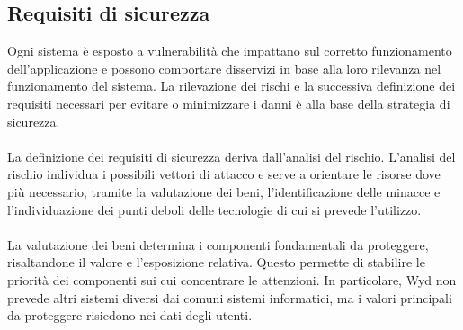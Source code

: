 \clearpage

\subsection{Requisiti di sicurezza}

Ogni sistema è esposto a vulnerabilità che impattano sul corretto funzionamento dell'applicazione
e possono comportare disservizi in base alla loro rilevanza nel funzionamento del sistema.
La rilevazione dei rischi e la successiva definizione dei requisiti necessari per evitare o minimizzare i danni
è alla base della strategia di sicurezza.\\
\\
La definizione dei requisiti di sicurezza deriva dall'analisi del rischio.
L'analisi del rischio individua i possibili vettori di attacco e serve a orientare le risorse dove più necessario,
tramite la valutazione dei beni, l'identificazione delle minacce e
l'individuazione dei punti deboli delle tecnologie di cui si prevede l'utilizzo.\\
\\
La valutazione dei beni determina i componenti fondamentali da proteggere,
risaltandone il valore e l'esposizione relativa.
Questo permette di stabilire le priorità dei componenti sui cui concentrare le attenzioni.
In particolare, Wyd non prevede altri sistemi diversi dai comuni sistemi informatici,
ma i valori principali da proteggere risiedono nei dati degli utenti.\\
\\
